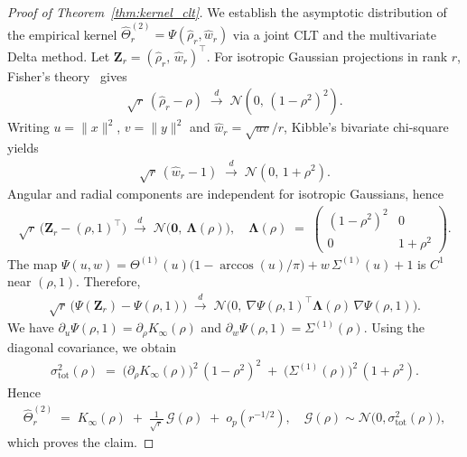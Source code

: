 \begin{proof}[Proof of Theorem~\ref{thm:kernel_clt}]
\label{appendix:proof-kernel-clt}
We establish the asymptotic distribution of the empirical kernel \( \hat{\Theta}^{(2)}_r = \Psi(\hat{\rho}_r,\hat{w}_r) \) via a joint CLT and the multivariate Delta method. Let \( \mathbf{Z}_r = (\hat{\rho}_r,\,\hat{w}_r)^\top \). For isotropic Gaussian projections in rank \( r \), Fisher's theory~\cite{fisher1915probable,hotelling1953new} gives
\begin{align}
\sqrt{r}\,(\hat{\rho}_r-\rho) \;\xrightarrow{d}\; \mathcal{N}\!\left(0,\,(1-\rho^2)^2\right).
\end{align}
Writing \( u=\|x\|^2 \), \( v=\|y\|^2 \) and \( \hat{w}_r=\sqrt{uv}/r \), Kibble's bivariate chi-square yields
\begin{align}
\sqrt{r}\,(\hat{w}_r-1) \;\xrightarrow{d}\; \mathcal{N}\!\left(0,\,1+\rho^2\right).
\end{align}
Angular and radial components are independent for isotropic Gaussians, hence
\begin{align}
\sqrt{r}\,\Big(\mathbf{Z}_r - (\rho,1)^\top\Big) \;\xrightarrow{d}\; \mathcal{N}\!\Big(\mathbf{0},\ \mathbf{\Lambda}(\rho)\Big),
\quad
\mathbf{\Lambda}(\rho) \;=\; \begin{pmatrix}
(1-\rho^2)^2 & 0\\[2pt]
0 & 1+\rho^2
\end{pmatrix}.
\end{align}
The map \( \Psi(u,w)=\Theta^{(1)}(u)\big(1-\arccos(u)/\pi\big) + w\,\Sigma^{(1)}(u)+1 \) is \( C^1 \) near \( (\rho,1) \). Therefore,
\begin{align}
\sqrt{r}\,\Big(\Psi(\mathbf{Z}_r) - \Psi(\rho,1)\Big) \;\xrightarrow{d}\; \mathcal{N}\!\Big(0,\ \nabla\Psi(\rho,1)^\top \mathbf{\Lambda}(\rho)\,\nabla\Psi(\rho,1)\Big).
\end{align}
We have \( \partial_u \Psi(\rho,1) = \partial_\rho K_\infty(\rho) \) and \( \partial_w \Psi(\rho,1) = \Sigma^{(1)}(\rho) \). Using the diagonal covariance, we obtain
\begin{align}
\sigma_{\mathrm{tot}}^2(\rho)
\;=\; \big(\partial_\rho K_\infty(\rho)\big)^2\,(1-\rho^2)^2 \;+\; \big(\Sigma^{(1)}(\rho)\big)^2\,(1+\rho^2).
\end{align}
Hence
\begin{align}
\hat{\Theta}^{(2)}_r \;=\; K_\infty(\rho) \;+\; \frac{1}{\sqrt{r}}\,\mathcal{G}(\rho) \;+\; o_p(r^{-1/2}),
\quad
\mathcal{G}(\rho)\sim \mathcal{N}\!\big(0,\sigma_{\mathrm{tot}}^2(\rho)\big),
\end{align}
which proves the claim.
\end{proof}

